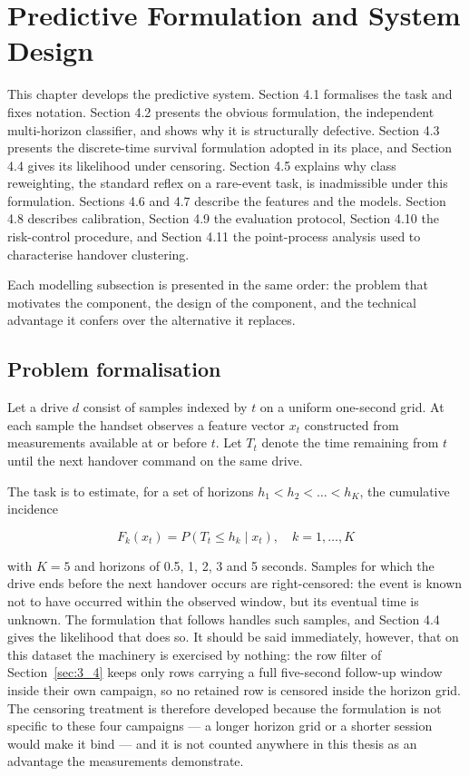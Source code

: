 \chapter{Predictive Formulation and System Design}\label{ch:4}

This chapter develops the predictive system. Section 4.1 formalises the task and fixes notation. Section 4.2 presents the obvious formulation, the independent multi-horizon classifier, and shows why it is structurally defective. Section 4.3 presents the discrete-time survival formulation adopted in its place, and Section 4.4 gives its likelihood under censoring. Section 4.5 explains why class reweighting, the standard reflex on a rare-event task, is inadmissible under this formulation. Sections 4.6 and 4.7 describe the features and the models. Section 4.8 describes calibration, Section 4.9 the evaluation protocol, Section 4.10 the risk-control procedure, and Section 4.11 the point-process analysis used to characterise handover clustering.

Each modelling subsection is presented in the same order: the problem that motivates the component, the design of the component, and the technical advantage it confers over the alternative it replaces.


\section{Problem formalisation}
\label{sec:4_1}

Let a drive $d$ consist of samples indexed by $t$ on a uniform one-second grid. At each sample the handset observes a feature vector $x_t$ constructed from measurements available at or before $t$. Let $T_t$ denote the time remaining from $t$ until the next handover command on the same drive.

The task is to estimate, for a set of horizons $h_1 < h_2 < \dots < h_K$, the cumulative incidence


\begin{equation}\label{eq:4_1} F_k(x_t) = P( T_t \le h_k \mid x_t ), \quad k = 1, \dots, K \end{equation}

with $K = 5$ and horizons of 0.5, 1, 2, 3 and 5 seconds. Samples for which the drive ends before the next handover occurs are right-censored: the event is known not to have occurred within the observed window, but its eventual time is unknown. The formulation that follows handles such samples, and Section 4.4 gives the likelihood that does so. It should be said immediately, however, that on this dataset the machinery is exercised by nothing: the row filter of Section~\ref{sec:3_4} keeps only rows carrying a full five-second follow-up window inside their own campaign, so no retained row is censored inside the horizon grid. The censoring treatment is therefore developed because the formulation is not specific to these four campaigns --- a longer horizon grid or a shorter session would make it bind --- and it is not counted anywhere in this thesis as an advantage the measurements demonstrate.


